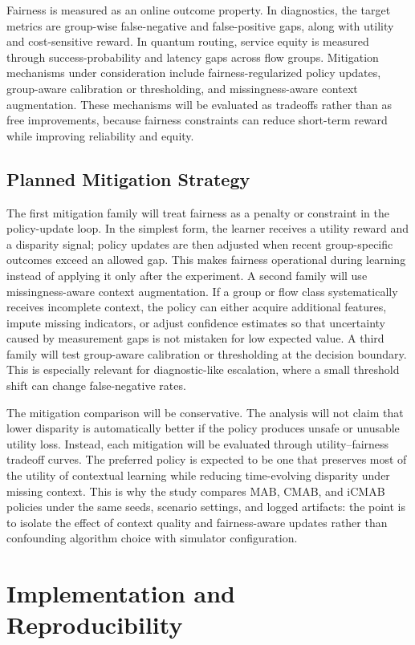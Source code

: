 \documentclass[conference]{IEEEtran}
\begin{document}
Fairness is measured as an online outcome property. In diagnostics, the target
metrics are group-wise false-negative and false-positive gaps, along with
utility and cost-sensitive reward. In quantum routing, service equity is
measured through success-probability and latency gaps across flow groups.
Mitigation mechanisms under consideration include fairness-regularized policy
updates, group-aware calibration or thresholding, and missingness-aware
context augmentation. These mechanisms will be evaluated as tradeoffs rather
than as free improvements, because fairness constraints can reduce short-term
reward while improving reliability and equity.

\subsection{Planned Mitigation Strategy}
The first mitigation family will treat fairness as a penalty or constraint in
the policy-update loop. In the simplest form, the learner receives a utility
reward and a disparity signal; policy updates are then adjusted when recent
group-specific outcomes exceed an allowed gap. This makes fairness operational
during learning instead of applying it only after the experiment. A second
family will use missingness-aware context augmentation. If a group or flow class
systematically receives incomplete context, the policy can either acquire
additional features, impute missing indicators, or adjust confidence estimates
so that uncertainty caused by measurement gaps is not mistaken for low expected
value. A third family will test group-aware calibration or thresholding at the
decision boundary. This is especially relevant for diagnostic-like escalation,
where a small threshold shift can change false-negative rates.

The mitigation comparison will be conservative. The analysis will not claim
that lower disparity is automatically better if the policy produces unsafe or
unusable utility loss. Instead, each mitigation will be evaluated through
utility--fairness tradeoff curves. The preferred policy is expected to be one
that preserves most of the utility of contextual learning while reducing
time-evolving disparity under missing context. This is why the study compares
MAB, CMAB, and iCMAB policies under the same seeds, scenario settings, and
logged artifacts: the point is to isolate the effect of context quality and
fairness-aware updates rather than confounding algorithm choice with simulator
configuration.


\section{Implementation and Reproducibility}
\end{document}
